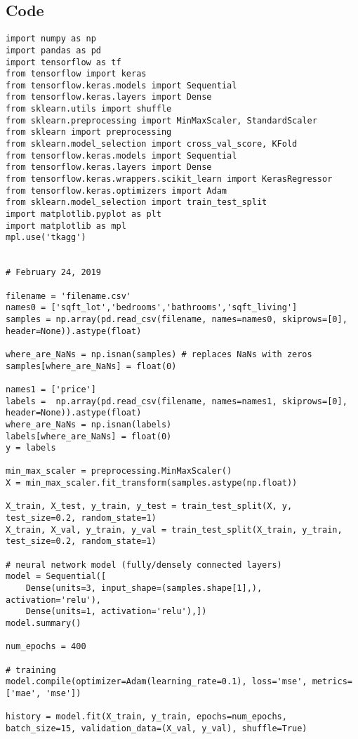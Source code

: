 \documentclass[12pt,a4paper]{article}
\begin{document}
\begin{appendices}

\section{Code}
\begin{Verbatim}[breaklines=true]
import numpy as np 
import pandas as pd
import tensorflow as tf 
from tensorflow import keras
from tensorflow.keras.models import Sequential 
from tensorflow.keras.layers import Dense 
from sklearn.utils import shuffle
from sklearn.preprocessing import MinMaxScaler, StandardScaler
from sklearn import preprocessing
from sklearn.model_selection import cross_val_score, KFold
from tensorflow.keras.models import Sequential
from tensorflow.keras.layers import Dense
from tensorflow.keras.wrappers.scikit_learn import KerasRegressor
from tensorflow.keras.optimizers import Adam
from sklearn.model_selection import train_test_split
import matplotlib.pyplot as plt
import matplotlib as mpl
mpl.use('tkagg')


# February 24, 2019

filename = 'filename.csv'
names0 = ['sqft_lot','bedrooms','bathrooms','sqft_living']
samples = np.array(pd.read_csv(filename, names=names0, skiprows=[0], header=None)).astype(float)

where_are_NaNs = np.isnan(samples) # replaces NaNs with zeros 
samples[where_are_NaNs] = float(0)

names1 = ['price']
labels =  np.array(pd.read_csv(filename, names=names1, skiprows=[0], header=None)).astype(float)
where_are_NaNs = np.isnan(labels)
labels[where_are_NaNs] = float(0)
y = labels

min_max_scaler = preprocessing.MinMaxScaler()
X = min_max_scaler.fit_transform(samples.astype(np.float))

X_train, X_test, y_train, y_test = train_test_split(X, y, test_size=0.2, random_state=1)
X_train, X_val, y_train, y_val = train_test_split(X_train, y_train, test_size=0.2, random_state=1)

# neural network model (fully/densely connected layers)
model = Sequential([
    Dense(units=3, input_shape=(samples.shape[1],), activation='relu'),
    Dense(units=1, activation='relu'),])
model.summary()

num_epochs = 400

# training
model.compile(optimizer=Adam(learning_rate=0.1), loss='mse', metrics=['mae', 'mse'])

history = model.fit(X_train, y_train, epochs=num_epochs, batch_size=15, validation_data=(X_val, y_val), shuffle=True)



\end{Verbatim}
\end{appendices}
\end{document}
